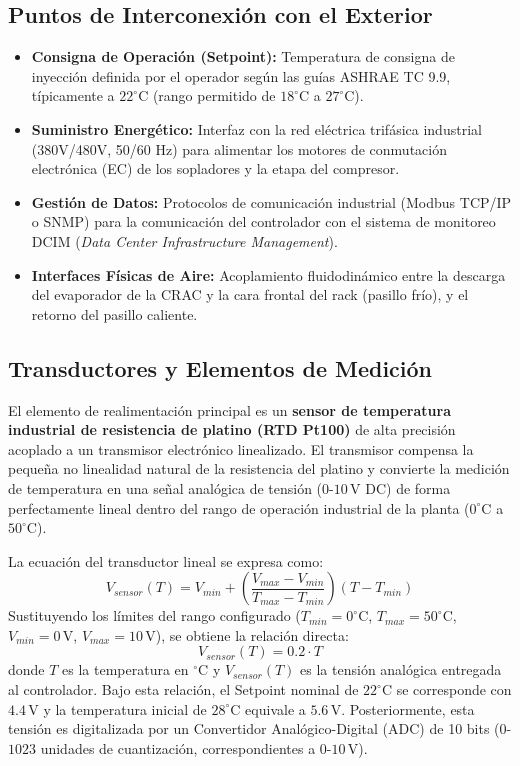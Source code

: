 \documentclass[journal,twocolumn]{IEEEtran}
\begin{document}
\subsection{Puntos de Interconexión con el Exterior}
\begin{itemize}
    \item \textbf{Consigna de Operación (Setpoint):} Temperatura de consigna de inyección definida por el operador según las guías ASHRAE TC 9.9, típicamente a $22^\circ$C (rango permitido de $18^\circ$C a $27^\circ$C).
    \item \textbf{Suministro Energético:} Interfaz con la red eléctrica trifásica industrial (380V/480V, 50/60 Hz) para alimentar los motores de conmutación electrónica (EC) de los sopladores y la etapa del compresor.
    \item \textbf{Gestión de Datos:} Protocolos de comunicación industrial (Modbus TCP/IP o SNMP) para la comunicación del controlador con el sistema de monitoreo DCIM (\textit{Data Center Infrastructure Management}).
    \item \textbf{Interfaces Físicas de Aire:} Acoplamiento fluidodinámico entre la descarga del evaporador de la CRAC y la cara frontal del rack (pasillo frío), y el retorno del pasillo caliente.
\end{itemize}

\subsection{Transductores y Elementos de Medición}
El elemento de realimentación principal es un \textbf{sensor de temperatura industrial de resistencia de platino (RTD Pt100)} de alta precisión acoplado a un transmisor electrónico linealizado. El transmisor compensa la pequeña no linealidad natural de la resistencia del platino y convierte la medición de temperatura en una señal analógica de tensión ($0$-$10$\,V DC) de forma perfectamente lineal dentro del rango de operación industrial de la planta ($0^\circ$C a $50^\circ$C).

La ecuación del transductor lineal se expresa como:
\begin{equation}
    V_{sensor}(T) = V_{min} + \left( \frac{V_{max} - V_{min}}{T_{max} - T_{min}} \right) (T - T_{min})
\end{equation}
Sustituyendo los límites del rango configurado ($T_{min} = 0^\circ$C, $T_{max} = 50^\circ$C, $V_{min} = 0$\,V, $V_{max} = 10$\,V), se obtiene la relación directa:
\begin{equation}
    V_{sensor}(T) = 0.2 \cdot T
\end{equation}
donde $T$ es la temperatura en $^\circ$C y $V_{sensor}(T)$ es la tensión analógica entregada al controlador. Bajo esta relación, el Setpoint nominal de $22^\circ$C se corresponde con $4.4$\,V y la temperatura inicial de $28^\circ$C equivale a $5.6$\,V. Posteriormente, esta tensión es digitalizada por un Convertidor Analógico-Digital (ADC) de 10 bits ($0$-$1023$ unidades de cuantización, correspondientes a $0$-$10$\,V).
\end{document}
